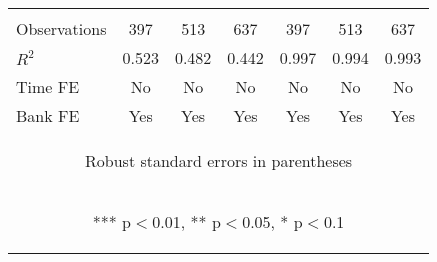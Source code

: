 \documentclass[]{article}
\begin{document}
\begin{center}
\begin{tabular}{lcccccc}
\vspace{4pt} & \begin{footnotesize}\end{footnotesize} & \begin{footnotesize}\end{footnotesize} & \begin{footnotesize}\end{footnotesize} & \begin{footnotesize}\end{footnotesize} & \begin{footnotesize}\end{footnotesize} & \begin{footnotesize}\end{footnotesize} \\
Observations & 397 & 513 & 637 & 397 & 513 & 637 \\
$R^2$ & 0.523 & 0.482 & 0.442 & 0.997 & 0.994 & 0.993 \\
Time FE & No & No & No & No & No & No \\
 Bank FE & Yes & Yes & Yes & Yes & Yes & Yes \\ \hline
\multicolumn{7}{c}{\begin{footnotesize} Robust standard errors in parentheses\end{footnotesize}} \\
\multicolumn{7}{c}{\begin{footnotesize} *** p$<$0.01, ** p$<$0.05, * p$<$0.1\end{footnotesize}} \\
\end{tabular}
\end{center}
\end{document}
